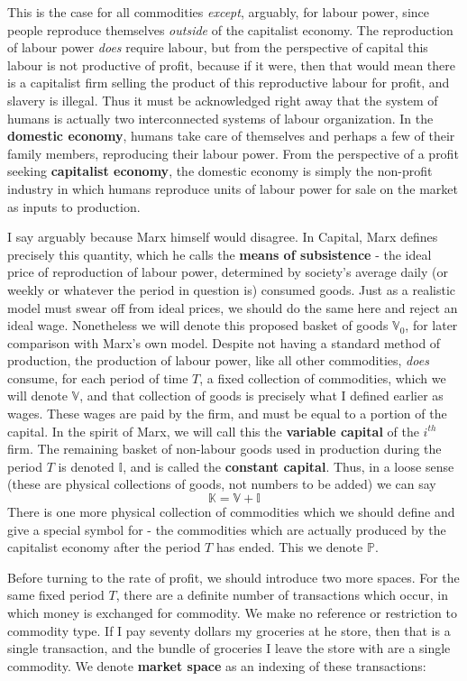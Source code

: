 This is the case for all commodities \textit{except}, arguably, for labour power, since people reproduce themselves \textit{outside} of the capitalist economy. The reproduction of labour power \textit{does} require labour, but from the perspective of capital this labour is not productive of profit, because if it were, then that would mean there is a capitalist firm selling the product of this reproductive labour for profit, and slavery is illegal. Thus it must be acknowledged right away that the system of humans is actually two interconnected systems of labour organization. In the \textbf{domestic economy}, humans take care of themselves and perhaps a few of their family members, reproducing their labour power. From the perspective of a profit seeking \textbf{capitalist economy}, the domestic economy is simply the non-profit industry in which humans reproduce units of labour power for sale on the market as inputs to production.  \par 
I say arguably because Marx himself would disagree. In Capital, Marx defines precisely this quantity, which he calls the \textbf{means of subsistence} - the ideal price of reproduction of labour power, determined by society's average daily (or weekly or whatever the period in question is) consumed goods. Just as a realistic model must swear off from ideal prices, we should do the same here and reject an ideal wage. Nonetheless we will denote this proposed basket of goods $\mathbb{V}_0$, for later comparison with Marx's own model. 
Despite not having a standard method of production, the production of labour power, like all other commodities, \textit{does} consume, for each period of time $T$, a fixed collection of commodities, which we will denote $\mathbb{V}$, and that collection of goods is precisely what I defined earlier as wages. These wages are paid by the firm, and must be equal to a portion of the capital. In the spirit of Marx, we will call this the \textbf{variable capital} of the $i^{th}$ firm. The remaining basket of non-labour goods used in production during the period $T$ is denoted $\mathbb{I}$, and is called the \textbf{constant capital}. Thus, in a loose sense (these are physical collections of goods, not numbers to be added) we can say 
\[ \mathbb{K} = \mathbb{V}+\mathbb{I} \]
There is one more physical collection of commodities which we should define and give a special symbol for - the commodities which are actually produced by the capitalist economy after the period $T$ has ended. This we denote $\mathbb{P}$. \par 
Before turning to the rate of profit, we should introduce two more spaces. For the same fixed period $T$, there are a definite number of transactions which occur, in which money is exchanged for commodity. We make no reference or restriction to commodity type. If I pay seventy dollars my groceries at he store, then that is a single transaction, and the bundle of groceries I leave the store with are a single commodity. We denote \textbf{market space} as an indexing of these transactions:
